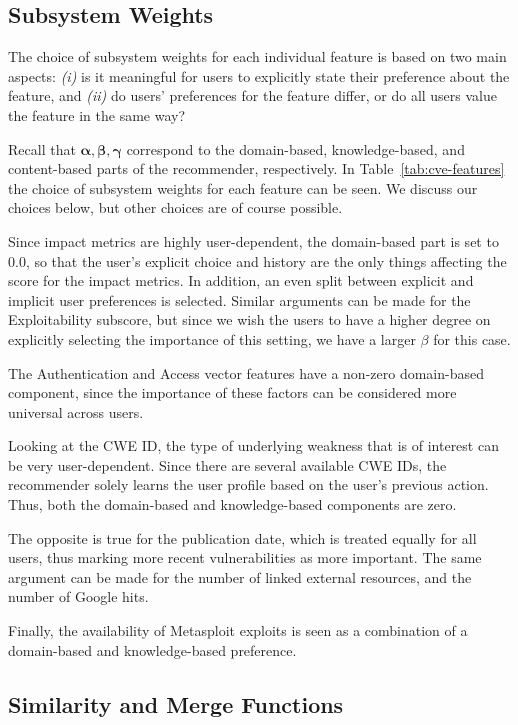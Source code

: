 {\subsection{Subsystem Weights}

The choice of subsystem weights for each individual feature is based on two main aspects:
\emph{(i)} is it meaningful for users to explicitly state their preference about the feature, and
\emph{(ii)} do users' preferences for the feature differ, or do all users value the feature in the same way?

Recall that $\bm{\alpha}, \bm{\beta}, \bm{\gamma}$ correspond to the domain-based, knowledge-based, and content-based parts of the recommender, respectively. In Table~\ref{tab:cve-features} the choice of subsystem weights for each feature can be seen. We discuss our choices below, but other choices are of course possible.%

Since impact metrics are highly user-dependent, the domain-based part is set to 0.0, so that the user's explicit choice and history are the only things affecting the score for the impact metrics. In addition, an even split between explicit and implicit user preferences is selected. Similar arguments can be made for the Exploitability subscore, but since we wish the users to have a higher degree on explicitly selecting the importance of this setting, we have a larger $\beta$ for this case.

The Authentication and Access vector features have a non-zero domain-based component, since the importance of these factors can be considered more universal across users.

Looking at the CWE ID, the type of underlying weakness that is of interest can be very user-dependent. Since there are several available CWE IDs, the recommender solely learns the user profile based on the user's previous action. Thus, both the domain-based and knowledge-based components are zero.

The opposite is true for the publication date, which is treated equally for all users, thus marking more recent vulnerabilities as more important. The same argument can be made for the number of linked external resources, and the number of Google hits.

Finally, the availability of Metasploit exploits is seen as a combination of a domain-based and knowledge-based preference.

\subsection{Similarity and Merge Functions}

}

